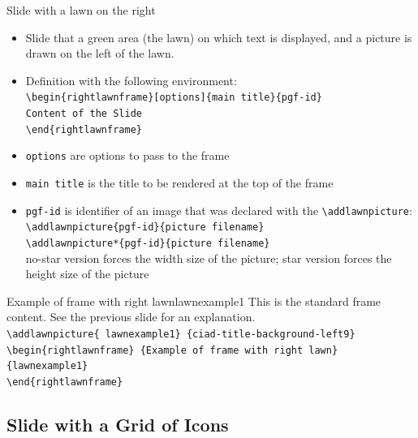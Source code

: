 \documentclass[english,sectioncirclenumberstyle]{ciadbeamer}
\begin{document}
\begin{frame}{Slide with a lawn on the right}
	\begin{itemize}
		\item Slide that a green area (the lawn) on which text is displayed, and a picture is drawn on the left of the lawn.
		\item Definition with the following environment: \\
			\texttt{{\textbackslash}begin\{rightlawnframe\}[options]\{main title\}\{pgf-id\}} \\
			\texttt{Content of the Slide} \\
			\texttt{{\textbackslash}end\{rightlawnframe\}}
		\item \texttt{options} are options to pass to the frame
		\item \texttt{main title} is the title to be rendered at the top of the frame
		\item \texttt{pgf-id} is identifier of an image that was declared with the \texttt{{\textbackslash}addlawnpicture}: \\
		\texttt{{\textbackslash}addlawnpicture\{pgf-id\}\{picture filename\}} \\
		\texttt{{\textbackslash}addlawnpicture*\{pgf-id\}\{picture filename\}} \\
		no-star version forces the width size of the picture; star version forces the height size of the picture
	\end{itemize}
\end{frame}

\begin{rightlawnframe}{{Example of frame} with right lawn}{lawnexample1}
	This is the standard frame content. See the previous slide for an explanation. \\[.5cm]
	\smaller
	\texttt{{\textbackslash}addlawnpicture\{ lawnexample1\} \{ciad-title-background-left9\}} \\
	\texttt{{\textbackslash}begin\{rightlawnframe\} \{Example of frame with right lawn\}\{lawnexample1\}} \\
	\texttt{{\textbackslash}end\{rightlawnframe\}}
\end{rightlawnframe}

\subsection{Slide with a Grid of Icons}
\end{document}
